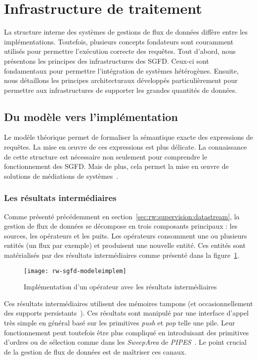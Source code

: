 \section{Infrastructure de traitement}\label{sec:rw:sgfd:infra}
La structure interne des systèmes de gestions de flux de données diffère entre les implémentations. Toutefois, plusieurs concepts fondateurs sont couramment utilisés pour permettre l'exécution correcte des requêtes. Tout d'abord, nous présentons les principes des infrastructures des SGFD. Ceux-ci sont fondamentaux pour permettre l'intégration de systèmes hétérogènes. Ensuite, nous détaillons les principes architecturaux développés particulièrement pour permettre aux infrastructures de supporter les grandes quantités de données.

\subsection{Du modèle vers l'implémentation}
Le modèle théorique permet de formaliser la sémantique exacte des expressions de requêtes. La mise en œuvre de ces expressions est plus délicate. La connaissance de cette structure est nécessaire non seulement pour comprendre le fonctionnement des SGFD. Mais de plus, cela permet la mise en œuvre de solutions de médiations de systèmes~\cite{Tatbul:integration}.

\subsubsection{Les résultats intermédiaires}
Comme présenté précédemment en section~\ref{sec:rw:supervision:datastream}, la gestion de flux de données se décompose en trois composants principaux : les sources, les opérateurs et les puits. Les opérateurs consomment une ou plusieurs entités (un flux par exemple) et produisent une nouvelle entité. Ces entités sont matérialisés par des résultats intermédiaires comme présenté dans la figure~\ref{fig:rw:sgfd:modeleimplem}.
\begin{figure}[ht]
    \centering
    \texttt{[image: rw-sgfd-modeleimplem]}
    \caption{Implémentation d'un opérateur avec les résultats intermédiaires}\label{fig:rw:sgfd:modeleimplem}
\end{figure}

Ces résultats intermédiaires utilisent des mémoires tampons (et occasionnellement des supports persistants~\cite{Abadi:aurora}). Ces résultats sont manipulé par une interface d'appel très simple en général basé sur les primitives \textit{push} et \textit{pop} telle une pile. Leur fonctionnement peut toutefois être plus compliqué en introduisant des primitives d'ordres ou de sélection comme dans les \textit{SweepArea} de \textit{PIPES}~\cite{Kramer:semantics}. Le point crucial de la gestion de flux de données est de maîtriser ces canaux.

